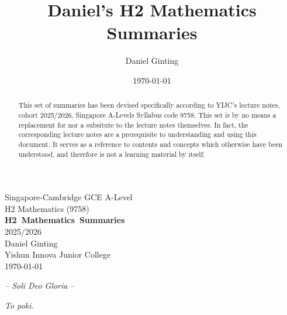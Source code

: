 \documentclass[a4paper]{article}
\title{Daniel's H2 Mathematics Summaries}
\author{Daniel Ginting}
\date{\today}
\begin{document}
	
	\begin{titlepage}
		\thispagestyle{empty}
		
		\begin{center}
			{\Large Singapore-Cambridge GCE A-Level}\\[0.5cm]
			{\large H2 Mathematics (9758)}\\[3cm]
			
			{\Huge\bfseries H2~Mathematics~Summaries}\\[1cm]
			{\Large 2025/2026}\\[3cm]
			
			{\large Daniel Ginting}\\[0.3cm]
			{\large Yishun Innova Junior College}\\[2cm]
			
			{\large \today}
		\end{center}
		
		\vfill
		
		\begin{center}
			\emph{-- Soli Deo Gloria --}
		\end{center}
		
	\end{titlepage}
	
	

\newpage
\thispagestyle{empty}

\vspace*{\fill}
\begin{center}
	\emph{To poki.}
\end{center}
\vspace*{\fill}

\newpage

\begin{abstract}

This set of summaries has been devised specifically according to YIJC's lecture notes, cohort 2025/2026,  Singapore A-Levels Syllabus code 9758. This set is by no means a replacement for nor a subsitute to the lecture notes themselves. In fact, the corresponding lecture notes are a prerequisite to understanding and using this document. It serves as a reference to contents and concepts which otherwise have been understood, and therefore is not a learning material by itself.

\end{abstract}
\end{document}
